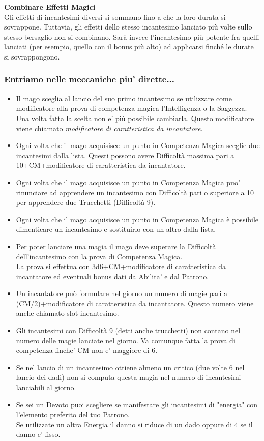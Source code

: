 \textbf{Combinare Effetti Magici}\\
Gli effetti di incantesimi diversi si sommano fino a che la loro durata si sovrappone. Tuttavia, gli effetti dello stesso incantesimo lanciato più volte sullo stesso bersaglio non si combinano. Sarà invece l'incantesimo più potente fra quelli lanciati (per esempio, quello con il bonus più alto) ad applicarsi finché le durate si sovrappongono.\\


\subsubsection{Entriamo nelle meccaniche piu' dirette...}

\begin{itemize}

\item
Il mago sceglia al lancio del suo primo incantesimo se utilizzare come modificatore alla prova di competenza magica l'Intelligenza o la Saggezza. Una volta fatta la scelta non e' più possibile cambiarla. Questo modificatore viene chiamato \emph{modificatore di caratteristica da incantatore}.
\item 
Ogni volta che il mago acquisisce un punto in Competenza Magica sceglie due incantesimi dalla lista. Questi possono avere Difficoltà massima pari a 10+CM+modificatore di caratteristica da incantatore.
\item
Ogni volta che il mago acquisisce un punto in Competenza Magica puo' rinunciare ad apprendere un incantesimo con Difficoltà pari o superiore a 10 per apprendere due Trucchetti (Difficoltà 9).
\item 
Ogni volta che il mago acquisisce un punto in Competenza Magica è possibile dimenticare un incantesimo e sostituirlo con un altro dalla lista.
\item 
Per poter lanciare una magia il mago deve superare la Difficoltà dell'incantesimo con la prova di Competenza Magica.\\
La prova si effettua con 3d6+CM+modificatore di caratteristica da incantatore ed eventuali bonus dati da Abilita' e dal Patrono.
\item 
Un incantatore può formulare nel giorno un numero di magie pari a (CM/2)+modificatore di caratteristica da incantatore. Questo numero viene anche chiamato slot incantesimo.
\item 
Gli incantesimi con Difficoltà 9 (detti anche trucchetti) non contano nel numero delle magie lanciate nel giorno. Va comunque fatta la prova di competenza finche' CM non e' maggiore di 6.
\item
Se nel lancio di un incantesimo ottiene almeno un critico (due volte 6 nel lancio dei dadi) non si computa questa magia nel numero di incantesimi lanciabili al giorno.
\item
Se sei un Devoto puoi scegliere se manifestare gli incantesimi di "energia" con l'elemento preferito del tuo Patrono.\\
Se utilizzate un altra Energia il danno si riduce di un dado oppure di 4 se il danno e' fisso.
\end{itemize}

